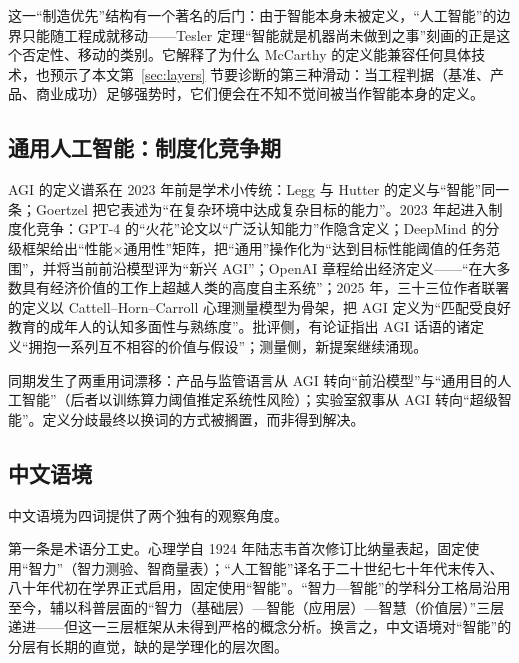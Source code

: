 \documentclass[10pt,fontset=fandol]{ctexart}
\begin{document}
这一“制造优先”结构有一个著名的后门：由于智能本身未被定义，“人工智能”的边界只能随工程成就移动——Tesler 定理“智能就是机器尚未做到之事”\cite{tesler1997effect}刻画的正是这个否定性、移动的类别。它解释了为什么 McCarthy 的定义能兼容任何具体技术，也预示了本文第~\ref{sec:layers} 节要诊断的第三种滑动：当工程判据（基准、产品、商业成功）足够强势时，它们便会在不知不觉间被当作智能本身的定义。

\subsection{通用人工智能：制度化竞争期}

AGI 的定义谱系在 2023 年前是学术小传统：Legg 与 Hutter 的定义与“智能”同一条\cite{legg2007universal}；Goertzel 把它表述为“在复杂环境中达成复杂目标的能力”\cite{goertzel2014agi}。2023 年起进入制度化竞争：GPT-4 的“火花”论文以“广泛认知能力”作隐含定义\cite{bubeck2023sparks}；DeepMind 的分级框架给出“性能$\times$通用性”矩阵，把“通用”操作化为“达到目标性能阈值的任务范围”，并将当前前沿模型评为“新兴 AGI”\cite{morris2023levels}；OpenAI 章程给出经济定义——“在大多数具有经济价值的工作上超越人类的高度自主系统”\cite{openai2018charter}；2025 年，三十三位作者联署的定义以 Cattell--Horn--Carroll 心理测量模型为骨架，把 AGI 定义为“匹配受良好教育的成年人的认知多面性与熟练度”\cite{hendrycks2025definition}。批评侧，有论证指出 AGI 话语的诸定义“拥抱一系列互不相容的价值与假设”\cite{blili2024unsocial,blili2025stop}；测量侧，新提案继续涌现\cite{xu2024meant,dhar2025generality,gignac2024defining}。

同期发生了两重用词漂移：产品与监管语言从 AGI 转向“前沿模型”与“通用目的人工智能”（后者以训练算力阈值推定系统性风险）；实验室叙事从 AGI 转向“超级智能”。定义分歧最终以换词的方式被搁置，而非得到解决。

\subsection{中文语境}\label{sec:cn}

中文语境为四词提供了两个独有的观察角度。

第一条是术语分工史。心理学自 1924 年陆志韦\cite{zhang2020psychometrics}首次修订比纳量表起，固定使用“智力”（智力测验、智商量表）；“人工智能”译名于二十世纪七十年代末传入、八十年代初在学界正式启用，固定使用“智能”。“智力—智能”的学科分工格局沿用至今，辅以科普层面的“智力（基础层）—智能（应用层）—智慧（价值层）”三层递进——但这一三层框架从未得到严格的概念分析。换言之，中文语境对“智能”的分层有长期的直觉，缺的是学理化的层次图。
\end{document}
